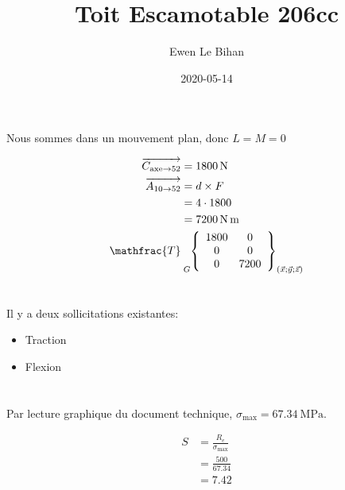 \documentclass{article}
\title{Toit Escamotable 206cc}
\author{Ewen Le Bihan}
\date{2020-05-14}
\newcommand{\torseur}[7]{
\tensor[_{#1}]{\left\{ \begin{array}{cc}
    #2 & #5 \\
    #3 & #6 \\
    #4 & #7
\end{array} \right\}}{_{(\vec{x};\vec{y};\vec{z})}}
}
\newcommand{\vect}[1]{\overrightarrow{#1}}
\begin{document}
\maketitle

\section{}

Nous sommes dans un mouvement plan, donc $L = M = 0$

\begin{equation*}
\begin{split}
    \vect{C_{\text{axe}\to 52}} &= \SI{1800}{\newton} \\
    \vect{A_{10\to 52}} &= d\times F \\
			&= 4 \cdot 1800 \\
			&= \SI{7200}{\newton\meter} \\
    \mathfrac{T} & \torseur{G}{1800}{0}{0}{0}{0}{7200}
\end{split}
\end{equation*}

\section{}

Il y a deux sollicitations existantes:
\begin{itemize}
    \item Traction
    \item Flexion
\end{itemize}

\section{}

Par lecture graphique du document technique, $\sigma_{\max} = \SI{67.34}{\mega\pascal}$.

\begin{equation*}
\begin{split}
    S &= \frac{R_e}{\sigma_{\max}} \\
      &= \frac{500}{67.34} \\
      &= 7.42
\end{split}
\end{equation*}
\end{document}
